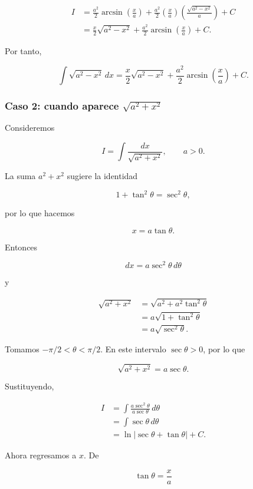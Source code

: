 \documentclass[12pt]{article}
\theoremstyle{definition}
\theoremstyle{remark}
\begin{document}
\begin{align*}
I
&=\frac{a^2}{2}\arcsin\left(\frac{x}{a}\right)
+\frac{a^2}{2}
\left(\frac{x}{a}\right)
\left(\frac{\sqrt{a^2-x^2}}{a}\right)+C\\
&=\frac{x}{2}\sqrt{a^2-x^2}
+\frac{a^2}{2}\arcsin\left(\frac{x}{a}\right)+C.
\end{align*}

Por tanto,

\[
\boxed{
\int\sqrt{a^2-x^2}\,dx
=
\frac{x}{2}\sqrt{a^2-x^2}
+\frac{a^2}{2}\arcsin\left(\frac{x}{a}\right)+C.}
\]

\subsubsection*{Caso 2: cuando aparece \(\sqrt{a^2+x^2}\)}

Consideremos

\[
I=\int\frac{dx}{\sqrt{a^2+x^2}},\qquad a>0.
\]

La suma $a^2+x^2$ sugiere la identidad

\[
1+\tan^2\theta=\sec^2\theta,
\]

por lo que hacemos

\[
\boxed{x=a\tan\theta}.
\]

Entonces

\[
dx=a\sec^2\theta\,d\theta
\]

y

\begin{align*}
\sqrt{a^2+x^2}
&=\sqrt{a^2+a^2\tan^2\theta}\\
&=a\sqrt{1+\tan^2\theta}\\
&=a\sqrt{\sec^2\theta}.
\end{align*}

Tomamos $-\pi/2<\theta<\pi/2$. En este intervalo $\sec\theta>0$, por lo que

\[
\sqrt{a^2+x^2}=a\sec\theta.
\]

Sustituyendo,

\begin{align*}
I
&=\int\frac{a\sec^2\theta}{a\sec\theta}\,d\theta\\
&=\int\sec\theta\,d\theta\\
&=\ln|\sec\theta+\tan\theta|+C.
\end{align*}

Ahora regresamos a $x$. De

\[
\tan\theta=\frac{x}{a}
\]
\end{document}
